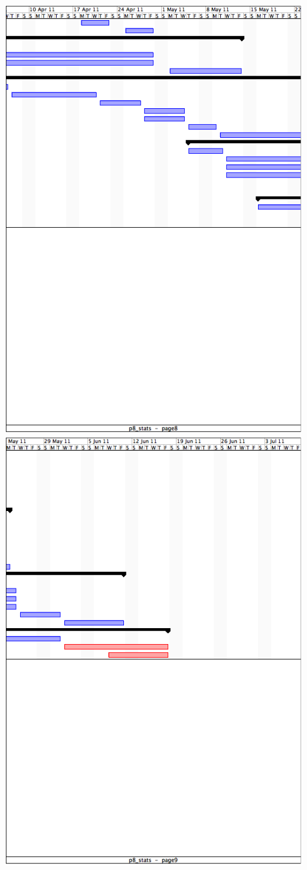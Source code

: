\includegraphics[scale=0.9]{img/gantt7.png} \newpage
\includegraphics[scale=0.9]{img/gantt8.png} \newpage